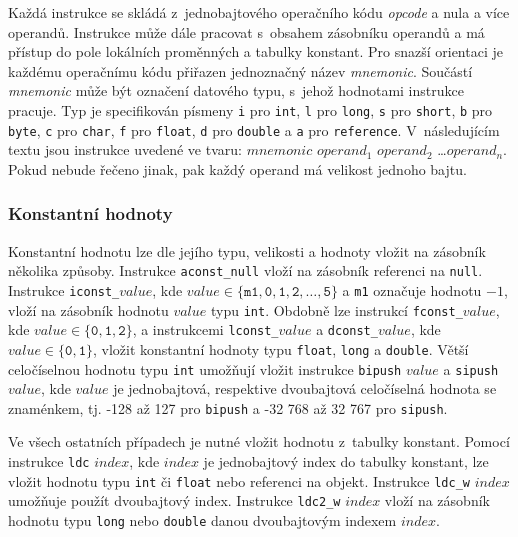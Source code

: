 Každá instrukce se skládá z~jednobajtového operačního kódu \textit{opcode} a nula a více operandů. Instrukce může dále pracovat s~obsahem zásobníku operandů a má přístup do pole lokálních proměnných a tabulky konstant. Pro snazší orientaci je každému operačnímu kódu přiřazen jednoznačný název \textit{mnemonic}. Součástí \textit{mnemonic} může být označení datového typu, s~jehož hodnotami instrukce pracuje. Typ je specifikován písmeny \texttt{i} pro \texttt{int}, \texttt{l} pro \texttt{long}, \texttt{s} pro \texttt{short}, \texttt{b} pro \texttt{byte}, \texttt{c} pro \texttt{char}, \texttt{f} pro \texttt{float}, \texttt{d} pro \texttt{double} a \texttt{a} pro \texttt{reference}. V~následujícím textu jsou instrukce uvedené ve tvaru: $mnemonic$ $operand_1$ $operand_2$ \dots $operand_n$. Pokud nebude řečeno jinak, pak každý operand má velikost jednoho bajtu.

\subsubsection{Konstantní hodnoty}

Konstantní hodnotu lze dle jejího typu, velikosti a hodnoty vložit na zásobník několika způsoby.
Instrukce \texttt{aconst\_null} vloží na zásobník referenci na \texttt{null}. 
Instrukce \texttt{iconst\_}$value$, kde $value \in \{ \texttt{m1}, \texttt{0}, \texttt{1}, \texttt{2}, \dots, \texttt{5}\}$ a \texttt{m1} označuje hodnotu $-1$, vloží na zásobník hodnotu $value$ typu \texttt{int}. Obdobně lze instrukcí \texttt{fconst\_}$value$, kde $value \in \{\texttt{0}, \texttt{1}, \texttt{2}\}$, a instrukcemi \texttt{lconst\_}$value$ a \texttt{dconst\_}$value$, kde $value \in \{\texttt{0}, \texttt{1}\}$, vložit konstantní hodnoty typu \texttt{float}, \texttt{long} a \texttt{double}. 
Větší celočíselnou hodnotu typu \texttt{int} umožňují vložit instrukce \texttt{bipush} $value$ a \texttt{sipush} $value$, kde $value$ je jednobajtová, respektive dvoubajtová celočíselná hodnota se znaménkem, tj. -128 až 127 pro \texttt{bipush} a -32 768 až 32 767 pro \texttt{sipush}.

Ve všech ostatních případech je nutné vložit hodnotu z~tabulky konstant. Pomocí instrukce \texttt{ldc} $index$, kde $index$ je jednobajtový index do tabulky konstant, lze vložit hodnotu typu \texttt{int} či \texttt{float} nebo referenci na objekt. Instrukce \texttt{ldc\_w} $index$ umožňuje použít dvoubajtový index. Instrukce \texttt{ldc2\_w} $index$ vloží na zásobník hodnotu typu \texttt{long} nebo \texttt{double} danou dvoubajtovým indexem  $index$.


